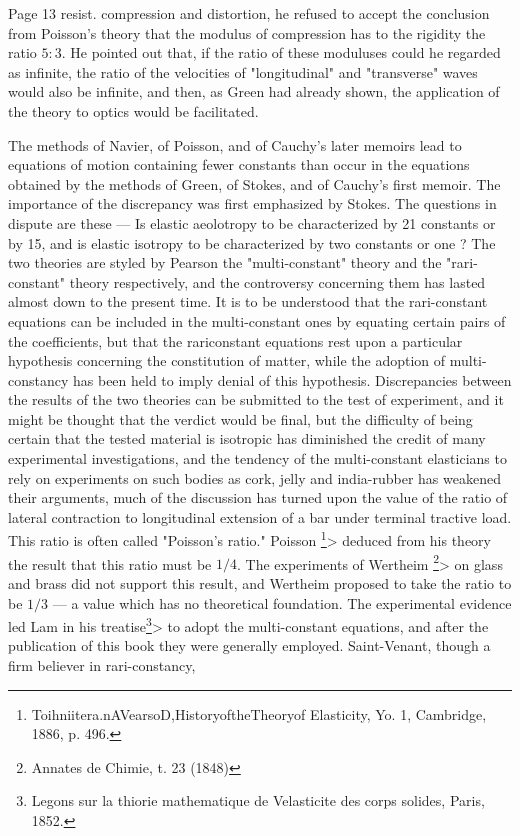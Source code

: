 
Page 13 resist. compression and distortion, he refused to accept the conclusion
from Poisson's theory that the modulus of compression has to the rigidity the
ratio \(5:3\). He pointed out that, if the ratio of these moduluses
could he regarded as infinite, the ratio of the velocities of "longitudinal"
and "transverse" waves would also be infinite, and then, as Green had already
shown, the application of the theory to optics would be facilitated.


The methods of Navier, of Poisson, and of Cauchy's later memoirs lead to
equations of motion containing fewer constants than occur in the equations
obtained by the methods of Green, of Stokes, and of Cauchy's first memoir. The
importance of the discrepancy was first emphasized by Stokes. The questions in
dispute are these — Is elastic aeolotropy to be characterized by 21 constants
or by 15, and is elastic isotropy to be characterized by two constants or one ?
The two theories are styled by Pearson the "multi-constant" theory and the
"rari-constant" theory respectively, and the controversy concerning them has
lasted almost down to the present time. It is to be understood that the
rari-constant equations can be included in the multi-constant ones by equating
certain pairs of the coefficients, but that the rariconstant equations rest
upon a particular hypothesis concerning the constitution of matter, while the
adoption of multi-constancy has been held to imply denial of this hypothesis.
Discrepancies between the results of the two theories can be submitted to the
test of experiment, and it might be thought that the verdict would be final,
but the difficulty of being certain that the tested material is isotropic has
diminished the credit of many experimental investigations, and the tendency of
the multi-constant elasticians to rely on experiments on such bodies as cork,
jelly and india-rubber has weakened their arguments, much of the discussion
has turned upon the value of the ratio of lateral contraction to longitudinal
extension of a bar under terminal tractive load. This ratio is often called
"Poisson's ratio."  Poisson \footnote{Toihniitera.nAVearsoD,HistoryoftheTheoryof
Elasticity, Yo. 1, Cambridge, 1886, p. 496.}> deduced from his theory the
result that this ratio must be \(1/4\). The experiments of Wertheim
\footnote{ Annates de Chimie, t. 23 (1848)}> on glass and brass did not
support this result, and Wertheim proposed to take the ratio to be \(1/3\) —
a value which has no theoretical foundation. The
experimental evidence led Lam in his treatise\footnote{Legons sur la thiorie
mathematique de Velasticite des corps solides, Paris, 1852.}> to adopt the
multi-constant equations, and after the publication of this book they were
generally employed. Saint-Venant, though a firm believer in rari-constancy,

